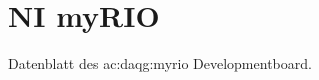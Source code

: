 %
%
%    
%	
%	
\chapter{NI myRIO}\label{ch:datasheet_myrio}
	Datenblatt des \gls{ac:daq}\gls{g:myrio} Developmentboard.
	
  